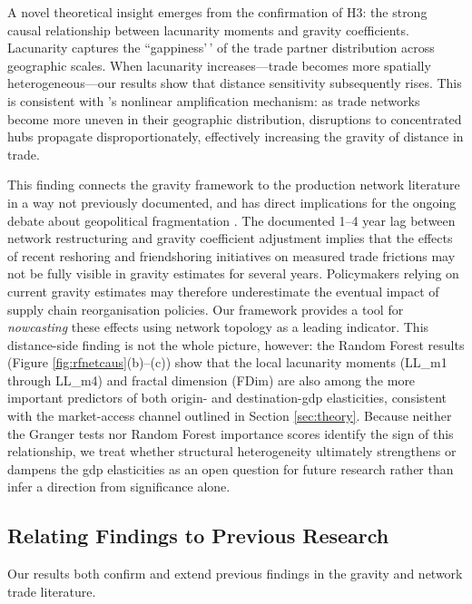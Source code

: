 \documentclass[preprint, 3p,
authoryear]{elsarticle} %
\begin{document}
A novel theoretical insight emerges from the confirmation of H3: the
strong causal relationship between lacunarity moments and gravity
coefficients. Lacunarity captures the ``gappiness'\,' of the trade
partner distribution across geographic scales. When lacunarity
increases---trade becomes more spatially heterogeneous---our results
show that distance sensitivity subsequently rises. This is consistent
with \citet{baqaee2019macroeconomic}'s nonlinear amplification
mechanism: as trade networks become more uneven in their geographic
distribution, disruptions to concentrated hubs propagate
disproportionately, effectively increasing the gravity of distance in
trade.

This finding connects the gravity framework to the production network
literature in a way not previously documented, and has direct
implications for the ongoing debate about geopolitical fragmentation
\citep{alfaro2023reallocation, freund2024supply}. The documented 1--4
year lag between network restructuring and gravity coefficient
adjustment implies that the effects of recent reshoring and
friendshoring initiatives on measured trade frictions may not be fully
visible in gravity estimates for several years. Policymakers relying on
current gravity estimates may therefore underestimate the eventual
impact of supply chain reorganisation policies. Our framework provides a
tool for \textit{nowcasting} these effects using network topology as a
leading indicator. This distance-side finding is not the whole picture,
however: the Random Forest results (Figure \ref{fig:rfnetcaus}(b)--(c))
show that the local lacunarity moments (LL\_m1 through LL\_m4) and
fractal dimension (FDim) are also among the more important predictors of
both origin- and destination-\gls{gdp} elasticities, consistent with the
market-access channel outlined in Section \ref{sec:theory}. Because
neither the Granger tests nor Random Forest importance scores identify
the sign of this relationship, we treat whether structural heterogeneity
ultimately strengthens or dampens the \gls{gdp} elasticities as an open
question for future research rather than infer a direction from
significance alone.

\subsection{Relating Findings to Previous
Research}\label{subsec:literature_connection}

Our results both confirm and extend previous findings in the gravity and
network trade literature.
\end{document}
